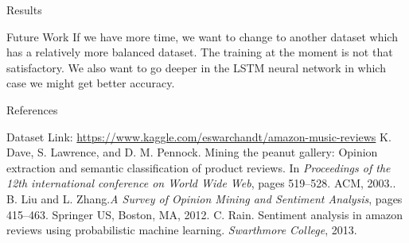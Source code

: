 \documentclass[final]{beamer}
\newlength{\onecolwid}
\begin{document}
\begin{frame}[t]
\begin{columns}[t]
\begin{column}{\onecolwid}
\begin{block}{Results}
\begin{itemize}
\end{itemize}
\end{block}


\begin{block}{Future Work}
If we have more time, we want to change to another dataset which has a relatively more balanced dataset. The training at the moment is not that satisfactory. We also want to go deeper in the
LSTM neural network in which case we might get better accuracy. 


\end{block}

\begin{block}{References}

\begin{thebibliography}{9}

Dataset Link: \url{https://www.kaggle.com/eswarchandt/amazon-music-reviews}
K. Dave, S. Lawrence, and D. M. Pennock. Mining the
peanut gallery: Opinion extraction and semantic classification
of product reviews. In \textit{Proceedings of the 12th international
conference on World Wide Web}, pages 519–528. ACM, 2003..
B. Liu and L. Zhang.\textit{A Survey of Opinion Mining and Sentiment Analysis}, pages 415–463. Springer US, Boston, MA,
2012.
C. Rain. Sentiment analysis in amazon reviews using probabilistic machine learning. \textit{Swarthmore College}, 2013.
\end{thebibliography}
\end{block}

\end{column} %

\end{columns} %

\end{frame} %
\end{document}
